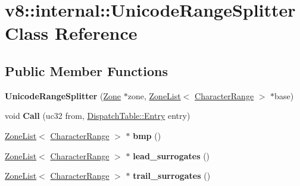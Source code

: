 \hypertarget{classv8_1_1internal_1_1_unicode_range_splitter}{}\section{v8\+:\+:internal\+:\+:Unicode\+Range\+Splitter Class Reference}
\label{classv8_1_1internal_1_1_unicode_range_splitter}
\subsection*{Public Member Functions}
\begin{DoxyCompactItemize}
\item 
{\bfseries Unicode\+Range\+Splitter} (\hyperlink{classv8_1_1internal_1_1_zone}{Zone} $\ast$zone, \hyperlink{classv8_1_1internal_1_1_zone_list}{Zone\+List}$<$ \hyperlink{classv8_1_1internal_1_1_character_range}{Character\+Range} $>$ $\ast$base)\hypertarget{classv8_1_1internal_1_1_unicode_range_splitter_af20e11d725b27ce0db862385b9cf24db}{}\label{classv8_1_1internal_1_1_unicode_range_splitter_af20e11d725b27ce0db862385b9cf24db}

\item 
void {\bfseries Call} (uc32 from, \hyperlink{classv8_1_1internal_1_1_dispatch_table_1_1_entry}{Dispatch\+Table\+::\+Entry} entry)\hypertarget{classv8_1_1internal_1_1_unicode_range_splitter_a45089e928fe902bb7b8ae6905037e4f5}{}\label{classv8_1_1internal_1_1_unicode_range_splitter_a45089e928fe902bb7b8ae6905037e4f5}

\item 
\hyperlink{classv8_1_1internal_1_1_zone_list}{Zone\+List}$<$ \hyperlink{classv8_1_1internal_1_1_character_range}{Character\+Range} $>$ $\ast$ {\bfseries bmp} ()\hypertarget{classv8_1_1internal_1_1_unicode_range_splitter_a21e9c9d11b05df1d6e97ac742a5175c9}{}\label{classv8_1_1internal_1_1_unicode_range_splitter_a21e9c9d11b05df1d6e97ac742a5175c9}

\item 
\hyperlink{classv8_1_1internal_1_1_zone_list}{Zone\+List}$<$ \hyperlink{classv8_1_1internal_1_1_character_range}{Character\+Range} $>$ $\ast$ {\bfseries lead\+\_\+surrogates} ()\hypertarget{classv8_1_1internal_1_1_unicode_range_splitter_a5e31b400610ed987aae75acdfb14fb95}{}\label{classv8_1_1internal_1_1_unicode_range_splitter_a5e31b400610ed987aae75acdfb14fb95}

\item 
\hyperlink{classv8_1_1internal_1_1_zone_list}{Zone\+List}$<$ \hyperlink{classv8_1_1internal_1_1_character_range}{Character\+Range} $>$ $\ast$ {\bfseries trail\+\_\+surrogates} ()\hypertarget{classv8_1_1internal_1_1_unicode_range_splitter_a1e0c1c29db4817209024a5b9b8e48fa5}{}\label{classv8_1_1internal_1_1_unicode_range_splitter_a1e0c1c29db4817209024a5b9b8e48fa5}


\end{DoxyCompactItemize}
